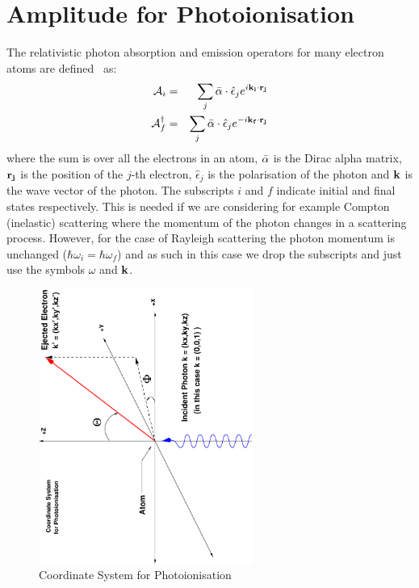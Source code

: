 \section{Amplitude for Photoionisation}
The relativistic photon absorption and emission operators for many electron atoms are 
defined~\cite{Kissel-S-Matrix} as:
\begin{eqnarray} \label{eq:photon-abs-emis}
    \mathcal{A}_i       & = & \sum_j \bar{\alpha} \cdot \hat{\epsilon}_j e^{i \mathbf{k_i} \cdot \mathbf{r_j} } \\
    \mathcal{A}_f^{\dag}   & = & \sum_j \bar{\alpha} \cdot \hat{\epsilon}_j e^{-i \mathbf{k_f} \cdot \mathbf{r_j} }
\end{eqnarray}
where the sum is over all the electrons in an atom, $\bar{\alpha}$ is the Dirac alpha
matrix, $\mathbf{r_j}$ is the position of the $j$-th electron, $\hat{\epsilon}_j$ is 
the polarisation of the photon and $\mathbf{k}$ is the wave vector of the photon.
The subscripts $i$ and $f$ indicate initial and final states respectively. This
is needed if we are considering for example Compton (inelastic) scattering where
the momentum of the photon changes in a scattering process. However, for the
case of Rayleigh scattering the photon momentum is unchanged 
($\hbar \omega_i = \hbar \omega_f$) and as such in this case we drop the
subscripts and just use the symbols $\omega$ and $\mathbf{k}$.
\begin{figure}[h]
    \begin{center}
        \includegraphics[angle=-90,width=7cm]{coords.eps}
    \end{center}
    \caption{Coordinate System for Photoionisation~\cite{Bransden-Joachain}}
    \label{fig:coordinates}
\end{figure}


